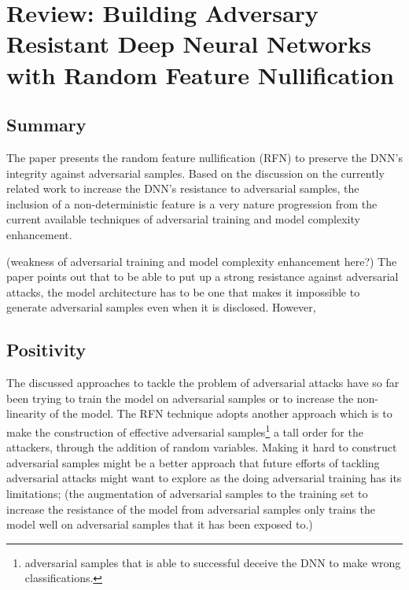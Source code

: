 \documentclass[a4paper,10pt]{article}
\theoremstyle{definition}
\begin{document}
\section*{Review: Building Adversary Resistant Deep Neural Networks with Random Feature Nullification}
\subsection*{Summary}
The paper presents the random feature nullification (RFN) to preserve the DNN's integrity against adversarial samples. Based on the discussion on the currently related work to increase the DNN's resistance to adversarial samples, the inclusion of a non-deterministic feature is a very nature progression from the current available techniques of adversarial training and model complexity enhancement. 

(weakness of adversarial training and model complexity enhancement here?) The paper points out that to be able to put up a strong resistance against adversarial attacks, the model architecture has to be one that makes it impossible to generate adversarial samples even when it is disclosed. However, \cite{goodfellow2014explaining} 





\subsection*{Positivity}
The discussed approaches to tackle the problem of adversarial attacks have so far been trying to train the model on adversarial samples or to increase the non-linearity of the model. The RFN technique adopts another approach which is to make the construction of effective adversarial samples\footnote{adversarial samples that is able to successful deceive the DNN to make wrong classifications.} a tall order for the attackers, through the addition of random variables. Making it hard to construct adversarial samples might be a better approach that future efforts of tackling adversarial attacks might want to explore as the doing adversarial training has its limitations; (the augmentation of adversarial samples to the training set to increase the resistance of the model from adversarial samples only trains the model well on adversarial samples that it has been exposed to.)
\end{document}
